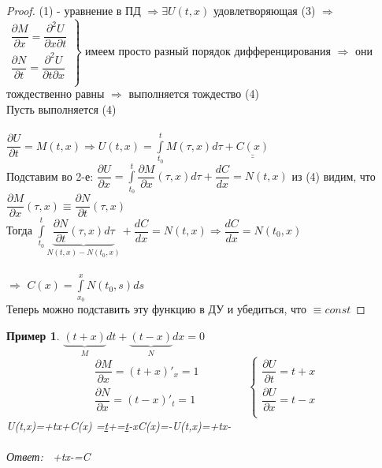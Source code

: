 \documentclass[12pt,a4paper,hidelinks]{article}            %
\newcommand{\pd}[2]{\dfrac{\partial #1}{\partial #2}}
\newcommand{\dd}[2]{\dfrac{d #1}{d #2}}
\newtheorem*{mex}{Пример}
\begin{document}
\begin{proof}
	(1) - уравнение в ПД $\Longrightarrow \exists U(t,x)$ удовлетворяющая (3) $\Longrightarrow$ \\
	$ \left.
    \begin{aligned}
    \pd{M}{x}=\dfrac{\partial^2U}{\partial x \partial t}\\
    \pd{N}{t}=\dfrac{\partial^2U}{\partial t \partial x}\\
    \end{aligned}
    \right\} $
    имеем просто разный порядок дифференцирования $\Longrightarrow$ они тождественно равны $\Longrightarrow$ выполняется тождество (4) \\
    \boxed{$\Longleftarrow$}
    Пусть выполняется (4) \\\\
    $\pd{U}{t}=M(t,x)\Longrightarrow U(t,x)=\int\limits^{t}_{t_0}M(\tau ,x)d\tau+\underline{\underline{C(x)}}$ \\
    Подставим во 2-е: $\pd{U}{x}=\int\limits^{t}_{t_0}\pd{M}{x}(\tau,x)d\tau+\dd{C}{x}=N(t,x)$ из (4) видим, что $\pd{M}{x}(\tau,x)\equiv\pd{N}{t}(\tau,x)$ \\
    Тогда $\int\limits^{t}_{t_0}\underbrace{\pd{N}{t}(\tau,x)d\tau}_{N(t,x)-N(t_0,x)}+\dd{C}{x}=N(t,x)\Longrightarrow\dd{C}{x}=N(t_0,x)$ \\\\
    $\Longrightarrow$ $C(x)=\int\limits^{x}_{x_0}N(t_0,s)ds$ \\
    Теперь можно подставить эту функцию в ДУ и убедиться, что $\equiv const$
\end{proof}
\begin{mex}
	$\underbrace{(t+x)}_Mdt+\underbrace{(t-x)}_Ndx=0$
	\begin{equation*}
    \begin{align*}
        \pd{M}{x}=(t+x)'_x=1\\
        \pd{N}{x}=(t-x)'_t=1\\
    \end{align*}
    \qquad\qquad
    \left\{
    \begin{align*}
        \pd{U}{t}=t+x\\
        \pd{U}{x}=t-x\\
    \end{align*}
    \right.
    \end{equation*}
	U(t,x)=+tx+C(x)
	\pd{U}{x}=\underline{t}+\dd{C}{x}=\underline{t}-x\Longrightarrow C(x)=-\Longrightarrow U(t,x)=+tx- \\\\
	\mbox{Ответ: } +tx-=C
\end{mex}
\end{document}
